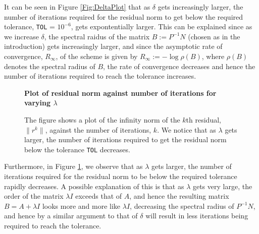 \documentclass[a4paper,11pt]{article}
\theoremstyle{break}
\theoremstyle{break2}
\theoremstyle{break}
\theoremstyle{break2}
\begin{document}
\newline\noindent
It can be seen in Figure \ref{Fig:DeltaPlot} that as $ \delta $ gets increasingly larger, the number of iterations required for the residual norm to get below the required tolerance, \texttt{TOL} = $ 10^{-6} $, gets expontentially larger. This can be explained since as we increase $ \delta $, the spectral raidus of the matrix $ B := P^{-1}N $ (chosen as in the introduction) gets increasingly larger, and since the asymptotic rate of convergence, $ R_{\infty} $, of the scheme is given by $ R_{\infty} := - \log\rho(B) $, where $ \rho(B) $ denotes the spectral radius of $ B $, the rate of convergence decreases and hence the number of iterations required to reach the tolerance increases.
\begin{figure}[h!]
	\begin{center}
		\textbf{Plot of residual norm against number of iterations for varying $ \lambda $}\par\medskip
		\resizebox{\linewidth}{\height}
		{
		
		}
		\caption{The figure shows a plot of the infinity norm of the $ k $th residual, $ \|r^{k}\| $, against the number of iterations, $ k $. We notice that as $ \lambda $ gets larger, the number of iterations required to get the residual norm below the tolerance \texttt{TOL} decreases. \label{Fig:LambdaPlot}}
	\end{center}
\end{figure}
\noindent
Furthermore, in Figure \ref{Fig:LambdaPlot}, we observe that as $ \lambda $ gets larger, the number of iterations required for the residual norm to be below the required tolerance rapidly decreases. A possible explanation of this is that as $ \lambda $ gets very large, the order of the matrix $ \lambda I $ exceeds that of $ A $, and hence the resulting matrix $ B = A + \lambda I $ looks more and more like $ \lambda I $, decreasing the spectral radius of $ P^{-1}N $, and hence by a similar argument to that of $ \delta $ will result in less iterations being required to reach the tolerance.
\end{document}
